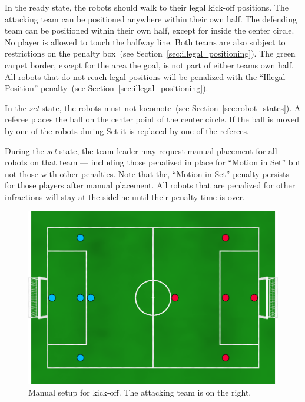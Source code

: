 \documentclass[12pt]{article}
\newcommand{\cf}{see\xspace}
\begin{document}
In the ready state, the robots should walk to their legal kick-off positions.
The attacking team can be positioned anywhere within their own half.
The defending team can be positioned within their own half, except for inside the center circle.
No player is allowed to touch the halfway line.
Both teams are also subject to restrictions on the penalty box~(\cf Section~\ref{sec:illegal_positioning}).
The green carpet border, except for the area the goal, is not part of either teams own half. All robots that do not reach legal positions will be penalized with the ``Illegal Position'' penalty~(\cf Section~\ref{sec:illegal_positioning}).


In the \emph{set} state, the robots must not locomote~(\cf Section~\ref{sec:robot_states}). A referee places the ball on the center point of the center circle. If the ball is moved by one of the robots during Set it is replaced by one of the referees.

During the \textit{set} state, the team leader may request manual placement for all robots on that team --- including those penalized in place for ``Motion in Set'' but not those with other penalties.
Note that the, ``Motion in Set'' penalty persists for those players after manual placement. All robots that are penalized for other infractions will stay at the sideline until their penalty time is over.

\begin{figure}[t]
\centerline{\includegraphics[width=\columnwidth]{figs/manual-placement-2020.png}}
\caption{Manual setup for kick-off.  The attacking team is on the right.}
\label{fig:ko}
\end{figure}
\end{document}
